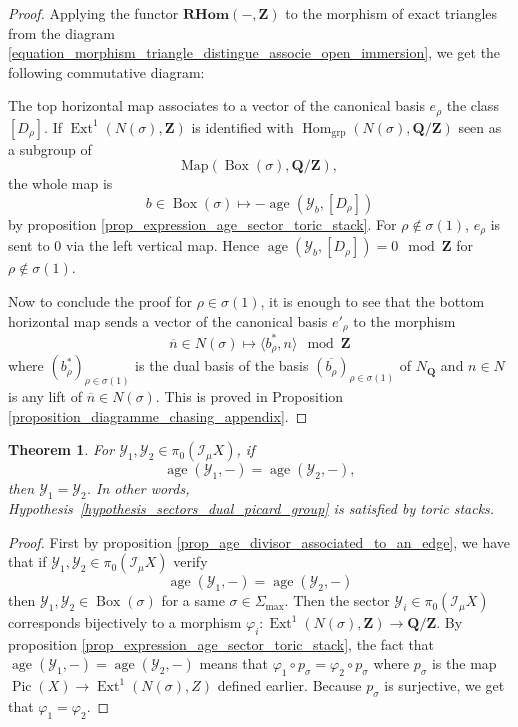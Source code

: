 \documentclass{proc-l}
\newcommand{\Z}{\mathbf{Z}}
\newcommand{\Q}{\mathbf{Q}}
\DeclareMathOperator{\Pic}{Pic}
\DeclareMathOperator{\grp}{grp}
\DeclareMathOperator{\Hom}{Hom}
\DeclareMathOperator{\Ext}{Ext}
\DeclareMathOperator{\age}{age}
\DeclareMathOperator{\Boxe}{Box}
\newcommand{\stackY}{\mathcal{Y}}
\newcommand{\sheafI}{\mathcal{I}}
\newcommand{\RHom}{\mathbf{R Hom}}
\newcommand{\sector}{\pi_0(\sheafI_{\mu} X)}
\newtheorem{theorem}{Theorem}[section]
\theoremstyle{definition}
\theoremstyle{remark}
\numberwithin{equation}{section}
\begin{document}
\begin{proof}
    Applying the functor $\RHom(-,\Z)$ to the morphism of exact triangles from the diagram \ref{equation_morphism_triangle_distingue_associe_open_immersion}, we get the following commutative diagram:
    \begin{center}
    \end{center}The top horizontal map associates to a vector of the canonical basis $e_{\rho}$ the class $[D_{\rho}]$. If $\Ext^1(N(\sigma),\Z)$ is identified with $\Hom_{\grp}(N(\sigma),\Q / \Z)$ seen as a subgroup of $$\text{Map}(\Boxe(\sigma),\Q / \Z) ,$$ the whole map is $$b \in \Boxe(\sigma) \longmapsto - \age(\stackY_b,[D_{\rho}]) $$by proposition \ref{prop_expression_age_sector_toric_stack}. For $\rho \not\in \sigma(1)$, $e_{\rho}$ is sent to $0$ via the left vertical map. Hence  $\age(\stackY_b,[D_{\rho}]) = 0 \mod \Z$ for $\rho \not\in \sigma(1)$.

    Now to conclude the proof for $\rho \in \sigma(1)$, it is enough to see that the bottom horizontal map sends a vector of the canonical basis $e'_{\rho}$ to the morphism $$\overline n \in N(\sigma) \longmapsto \langle b_{\rho}^* , n \rangle \mod \Z $$where $(b_{\rho}^*)_{\rho \in \sigma(1)}$ is the dual basis of the basis $(\overline{b_{\rho}})_{\rho \in \sigma(1)}$ of $N_{\Q}$ and $n \in N$ is any lift of $\overline n \in N(\sigma)$. This is proved in Proposition \ref{proposition_diagramme_chasing_appendix}.
\end{proof}

\begin{theorem}\label{theorem_sectors_dual_picard_group_toric_stacks}
    For $\stackY_1, \stackY_2 \in \sector$, if
\[
\age(\stackY_1,-) = \age(\stackY_2,-),
\]
then $\stackY_1 = \stackY_2$. In other words, Hypothesis~\ref{hypothesis_sectors_dual_picard_group}
is satisfied by toric stacks.

\end{theorem}
    

\begin{proof}
    First by proposition \ref{prop_age_divisor_associated_to_an_edge}, we have that if $\stackY_1, \stackY_2 \in \sector$ verify $$\age(\stackY_1,-) = \age(\stackY_2,-)$$ then $\stackY_1, \stackY_2 \in \Boxe(\sigma) $ for a same $\sigma \in \Sigma_{\max}$. Then the sector $\stackY_i \in \sector$ corresponds bijectively to a morphism $\varphi_i : \Ext^1(N(\sigma),\Z) \rightarrow \Q / \Z$. By proposition \ref{prop_expression_age_sector_toric_stack}, the fact that $\age(\stackY_1,-) = \age(\stackY_2,-)$ means that $\varphi_1 \circ p_{\sigma} = \varphi_2 \circ p_{\sigma}$ where $p_{\sigma}$ is the map $ \Pic(X) \rightarrow \Ext^1(N(\sigma),Z)$ defined earlier. Because $p_{\sigma}$ is surjective, we get that $\varphi_1 = \varphi_2$.
\end{proof}
\end{document}
